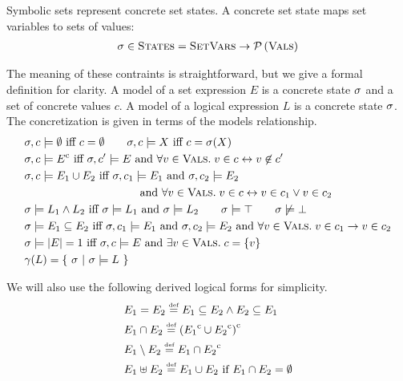 Symbolic sets represent concrete set states.  A concrete set state maps set variables to sets of values:
\begin{align*}
    \sigma \in \textsc{States} = \textsc{SetVars} \rightarrow \mathcal{P}\left({\textsc{Vals}}\right)
\end{align*}

The meaning of these contraints is straightforward, but we give a formal definition for clarity.  A model of a set expression $E$ is a concrete state $\sigma$ and a set of concrete values $c$.  A model of a logical expression $L$ is a concrete state $\sigma$.  The concretization is given in terms of the models relationship.
\begin{align*}
  & \sigma, c \models \emptyset \textrm{ iff } c = \emptyset \qquad \sigma, c \models X \textrm{ iff } c = \sigma(X) \\
  & \sigma, c \models {E}^{\mathrm{c}} \textrm{ iff } \sigma, c' \models{E} \textrm{ and } \forall v \in \textsc{Vals}. \; v \in c \leftrightarrow v \not\in c' \\
  & \sigma, c \models E_1 \cup E_2 \textrm{ iff } \sigma, c_1 \models E_1 \textrm{ and } \sigma, c_2 \models E_2\\
  & \qquad \qquad \qquad \qquad \qquad  \textrm{ and } \forall v \in \textsc{Vals}. \; v \in c \leftrightarrow v \in c_1 \vee v \in c_2 \\
  & \sigma \models L_1 \wedge L_2 \textrm{ iff } \sigma \models L_1 \textrm{ and } \sigma \models L_2 \qquad \sigma \models \top \qquad \sigma \not\models \bot \\
  & \sigma \models E_1 \subseteq E_2 \textrm{ iff } \sigma, c_1 \models E_1 \textrm{ and } \sigma, c_2 \models E_2 \textrm{ and } \forall v \in \textsc{Vals}. \; v \in c_1 \rightarrow v \in c_2 \\
  & \sigma \models |{E}| = 1 \textrm{ iff } \sigma, c \models E \textrm{ and } \exists v \in \textsc{Vals}. \; c = \{v\} \\
  & \gamma(L) = \{\ \sigma \ |\  \sigma \models L\ \}
\end{align*}

We will also use the following derived logical forms for simplicity.
\begin{align*}
 & E_1 = E_2 \stackrel{\textrm{\tiny def}}{=} E_1 \subseteq E_2 \wedge E_2 \subseteq E_1 \\
 & E_1 \cap E_2 \stackrel{\textrm{\tiny def}}{=} {({E_1}^{\mathrm{c}} \cup {E_2}^{\mathrm{c}})}^{\mathrm{c}} \\
 & E_1 \setminus E_2 \stackrel{\textrm{\tiny def}}{=} E_1 \cap {E_2}^{\mathrm{c}} \\
 & E_1 \uplus E_2 \stackrel{\textrm{\tiny def}}{=} E_1 \cup E_2 \textrm{ if } E_1 \cap E_2 = \emptyset
\end{align*}

